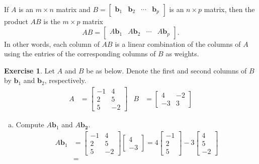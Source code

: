 \documentclass[10pt]{book}
\newcommand{\boxcolor}{gray!30}
\newenvironment{boxme}{\begin{mdframed}[backgroundcolor=\boxcolor,linewidth=0pt,nobreak=true]}{\end{mdframed}}
\theoremstyle{definition}
\newtheorem{exercise}{Exercise}[section]
\newcommand{\vect}[1]{\ensuremath{\boldsymbol{\mathbf{#1}}}}
\begin{document}
\newpage


\begin{boxme}
	If $A$ is an $m\times n$ matrix and $B=\begin{bmatrix}\vect{b}_1&\vect{b}_2&\cdots&\vect{b}_p\end{bmatrix}$ is an $n\times p$ matrix, then the product $AB$ is the $m\times p$ matrix
	$$ AB = \begin{bmatrix}A\vect{b}_1&A\vect{b}_2&\cdots&A\vect{b}_p\end{bmatrix}. $$
	In other words, each column of $AB$ is a linear combination of the columns of $A$ using the entries of the corresponding columns of $B$ as weights.
\end{boxme}
\begin{exercise} %
	Let $A$ and $B$ be as below. Denote the first and second columns of $B$ by $\vect{b}_1$ and $\vect{b}_2$, respectively.
	\begin{align*}
	A &= \begin{bmatrix}-1&4\\2&5\\5&-2\end{bmatrix} &
	B &= \begin{bmatrix}4&-2\\-3&3\end{bmatrix}
	\end{align*}
	\begin{multicols}{2}
		\begin{enumerate}[(a)]
			\item Compute $A\vect{b}_1$ and $A\vect{b_2}$.
			\begin{align*}
			A\vect{b}_1 &=
			\begin{bmatrix}-1&4\\2&5\\5&-2\end{bmatrix}
			\begin{bmatrix}4\\-3\end{bmatrix}
			= 4\begin{bmatrix}-1\\2\\5\end{bmatrix}
			-3\begin{bmatrix}4\\5\\-2\end{bmatrix} \\
			&=

\end{align*}
\end{enumerate}
\end{multicols}
\end{exercise}
\end{document}
